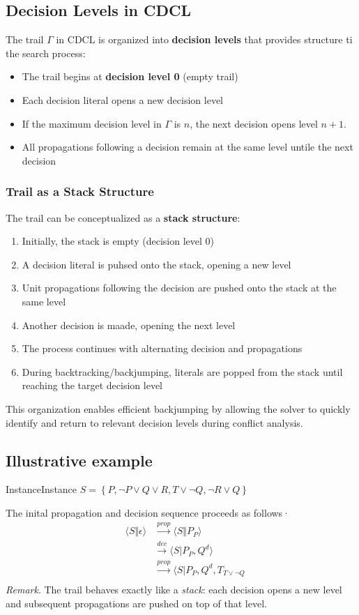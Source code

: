 \documentclass[a4paper]{article}
\theoremstyle{definition}
\begin{document}
\subsection{Decision Levels in CDCL}
The trail \( \varGamma \) in CDCL is organized into \textbf{decision levels} that provides
structure ti the search process:
\begin{itemize}
    \item The trail begins at \textbf{decision level 0} (empty trail)
    \item Each decision literal opens a new decision level 
    \item If the maximum decision level in \( \varGamma \) is \( n \), the next decision opens level \( n + 1 \).
    \item All propagations following a decision remain at the same level untile the next decision
\end{itemize}
\subsubsection{Trail as a Stack Structure}
The trail can be conceptualized as a \textbf{stack structure}:
\begin{enumerate}
    \item Initially, the stack is empty (decision level 0)
    \item A decision literal is puhsed onto the stack, opening a new level
    \item Unit propagations following the decision are pushed onto the stack at the same level 
    \item Another decision is maade, opening the next level 
    \item The process continues with alternating decision and propagations
    \item During backtracking/backjumping, literals are popped from the stack until reaching the target decision level
\end{enumerate}
This organization enables efficient backjumping by allowing the solver to quickly identify and 
return to relevant decision levels during conflict analysis.

\subsection{Illustrative example}
\begin{example}{Instance}{Instance}
\( S = \left\{ P, \lnot P \vee Q \vee R, T \vee \lnot Q, \lnot R \vee Q \right\} \)
\end{example}
The inital propagation and decision sequence proceeds as follows·
\begin{align*}
  &\langle S \Vert \epsilon \rangle & \xrightarrow{prop} \langle S \Vert P_P \rangle\\
  & & \xrightarrow{dec} \langle S \vert P_P, Q^d \rangle \\
  & & \xrightarrow{prop} \langle S \vert P_P, Q^d, T_{T \vee \lnot Q} \\
\end{align*}
\textit{Remark}. The trail behaves exactly like a \textit{stack}: each decision opens a new level and subsequent propagations 
are pushed on top of that level.
\end{document}
